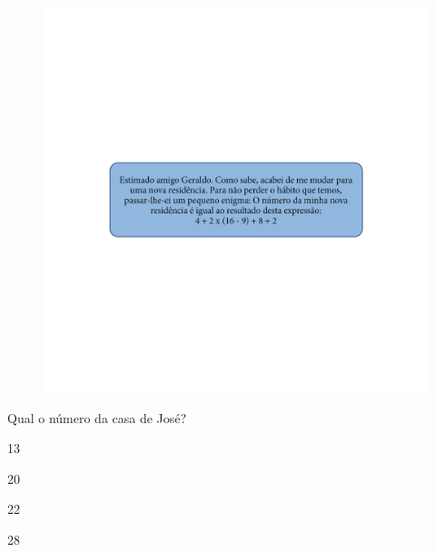 \begin{figure}[htpb!]
\includegraphics[width=\textwidth]{../ilustracoes/MAT5/SAEB_5ANO_MAT_figura124.png}
\end{figure}


Qual o número da casa de José?

\begin{escolha}
\item
  13
\item
  20
\item
  22
\item
  28
\end{escolha}

